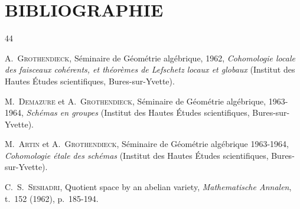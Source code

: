 \clearpage
{}
{}
\section*{BIBLIOGRAPHIE}

\begingroup\renewcommand{\chapter}[2]{}%
\begin{thebibliography}{44}

A.~\textsc{Grothendieck}, Séminaire de Géométrie algébrique, 1962,
\emph{Cohomologie locale des faisceaux cohérents, et théorèmes de Lefschetz locaux
et globaux} (Institut des Hautes Études scientifiques, Bures-sur-Yvette).

M.~\textsc{Demazure} et A.~\textsc{Grothendieck}, Séminaire de Géométrie algébrique,
1963-1964, \emph{Schémas en groupes} (Institut des Hautes Études scientifiques,
Bures-sur-Yvette).

M.~\textsc{Artin} et A.~\textsc{Grothendieck}, Séminaire de Géométrie algébrique
1963-1964, \emph{Cohomologie étale des schémas} (Institut des Hautes Études
scientifiques, Bures-sur-Yvette).

C.~S.~\textsc{Seshadri}, Quotient space by an abelian variety,
\emph{Mathematische Annalen}, t.~152 (1962), p.~185-194.

\end{thebibliography}
\endgroup
